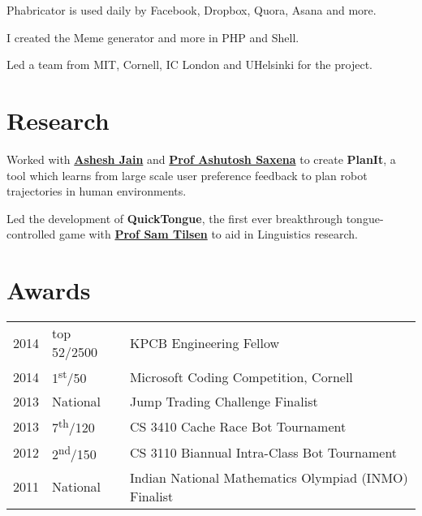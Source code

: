 \documentclass[]{deedy-resume-openfont}
\begin{document}
\begin{minipage}[t]{0.66\textwidth}
\begin{tightemize}
\item Phabricator is used daily by Facebook, Dropbox, Quora, Asana and more.
\item I created the Meme generator and more in PHP and Shell.
\item Led a team from MIT, Cornell, IC London and UHelsinki for the project.
\end{tightemize}
\sectionsep


\section{Research}
Worked with \textbf{\href{http://www.cs.cornell.edu/~ashesh/}{Ashesh Jain}} and \textbf{\href{http://www.cs.cornell.edu/~asaxena/}{Prof Ashutosh Saxena}} to create \textbf{PlanIt}, a tool which  learns from large scale user preference feedback to plan robot trajectories in human environments.  
\sectionsep

Led the development of \textbf{QuickTongue}, the first ever breakthrough tongue-controlled game with \textbf{\href{http://conf.ling.cornell.edu/~tilsen/}{Prof Sam Tilsen}} to aid in Linguistics research. 
\sectionsep


\section{Awards} 
\begin{tabular}{rll}
2014	     & top 52/2500  & KPCB Engineering Fellow\\
2014	     & 1\textsuperscript{st}/50  & Microsoft Coding Competition, Cornell\\
2013	     & National  & Jump Trading Challenge Finalist\\
2013     & 7\textsuperscript{th}/120 & CS 3410 Cache Race Bot Tournament  \\
2012     & 2\textsuperscript{nd}/150 & CS 3110 Biannual Intra-Class Bot Tournament \\
2011     & National & Indian National Mathematics Olympiad (INMO) Finalist \\
\end{tabular}
\sectionsep


\end{minipage}
\end{document}
